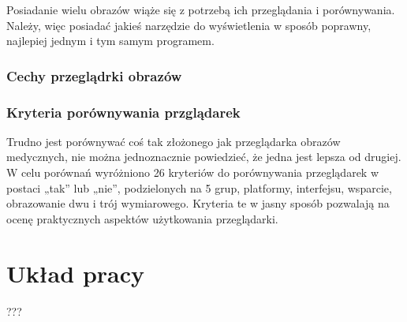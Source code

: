 Posiadanie wielu obrazów wiąże się z potrzebą ich przeglądania i porównywania.
Należy, więc posiadać jakieś narzędzie do wyświetlenia w sposób poprawny, najlepiej jednym i tym samym programem.


\subsubsection{Cechy przeglądrki obrazów}

\subsubsection{Kryteria porównywania przglądarek}

Trudno jest porównywać coś tak złożonego jak przeglądarka obrazów medycznych, nie można jednoznacznie powiedzieć, że jedna jest lepsza od drugiej.
W celu porównań wyróżniono 26 kryteriów do porównywania przeglądarek w postaci „tak” lub „nie”, podzielonych na 5 grup, platformy, interfejsu, wsparcie, obrazowanie dwu i trój wymiarowego.
Kryteria te w jasny sposób pozwalają na ocenę praktycznych aspektów użytkowania przeglądarki.

\section{Układ pracy}

???
